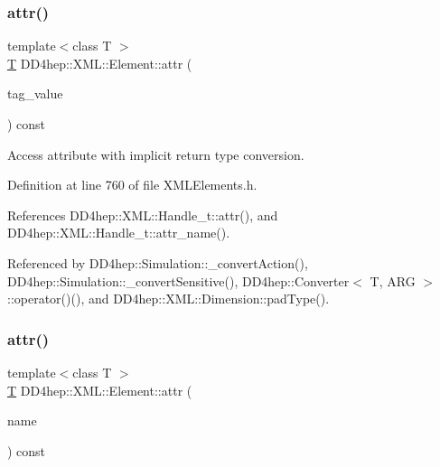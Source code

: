 \subsubsection{\texorpdfstring{attr()}{attr()}\hspace{0.1cm}{\footnotesize\ttfamily [1/2]}}
{\footnotesize\ttfamily template$<$class T $>$ \\
\hyperlink{class_t}{T} D\+D4hep\+::\+X\+M\+L\+::\+Element\+::attr (\begin{DoxyParamCaption}\item[{const \hyperlink{namespace_d_d4hep_1_1_x_m_l_a09e5d9cc86ed782f6826dfe0778c1815}{Xml\+Char} $\ast$}]{tag\+\_\+value }\end{DoxyParamCaption}) const\hspace{0.3cm}{\ttfamily [inline]}}



Access attribute with implicit return type conversion. 



Definition at line 760 of file X\+M\+L\+Elements.\+h.



References D\+D4hep\+::\+X\+M\+L\+::\+Handle\+\_\+t\+::attr(), and D\+D4hep\+::\+X\+M\+L\+::\+Handle\+\_\+t\+::attr\+\_\+name().



Referenced by D\+D4hep\+::\+Simulation\+::\+\_\+convert\+Action(), D\+D4hep\+::\+Simulation\+::\+\_\+convert\+Sensitive(), D\+D4hep\+::\+Converter$<$ T, A\+R\+G $>$\+::operator()(), and D\+D4hep\+::\+X\+M\+L\+::\+Dimension\+::pad\+Type().

\hypertarget{class_d_d4hep_1_1_x_m_l_1_1_element_ae7ec20c820dab2ff2e1078813aba69ca}{}\label{class_d_d4hep_1_1_x_m_l_1_1_element_ae7ec20c820dab2ff2e1078813aba69ca} 
\subsubsection{\texorpdfstring{attr()}{attr()}\hspace{0.1cm}{\footnotesize\ttfamily [2/2]}}
{\footnotesize\ttfamily template$<$class T $>$ \\
\hyperlink{class_t}{T} D\+D4hep\+::\+X\+M\+L\+::\+Element\+::attr (\begin{DoxyParamCaption}\item[{const char $\ast$}]{name }\end{DoxyParamCaption}) const\hspace{0.3cm}{\ttfamily [inline]}}



